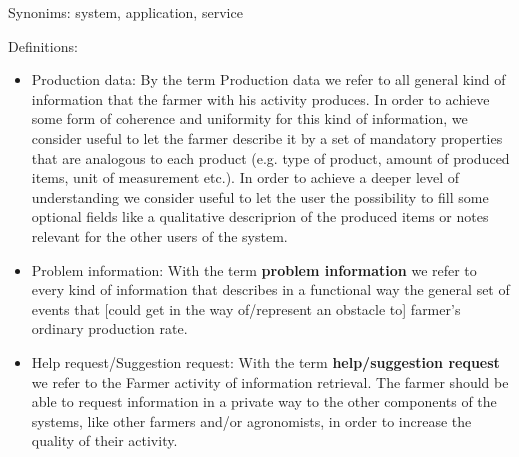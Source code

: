 Synonims: system, application, service

Definitions:
\begin{itemize}
    \item Production data: By the term Production data we refer to all general kind of information that the farmer with his activity produces. In order to achieve some form of coherence and uniformity for this kind of information, we consider useful to let the farmer describe it by a set of mandatory properties that are analogous to each product (e.g. type of product, amount of produced items, unit of measurement etc.). In order to achieve a deeper level of understanding we consider useful to let the user the possibility to fill some optional fields like a qualitative descriprion of the produced items or notes relevant for the other users of the system.
    \item Problem information: With the term \textbf{problem information} we refer to every kind of information that describes in a functional way the general set of events that [could get in the way of/represent an obstacle to] farmer's ordinary production rate.
    \item Help request/Suggestion request: With the term \textbf{help/suggestion request} we refer to the Farmer activity of information retrieval. The farmer should be able to request information in a private way to the other components of the systems, like other farmers and/or agronomists, in order to increase the quality of their activity.

\end{itemize}

